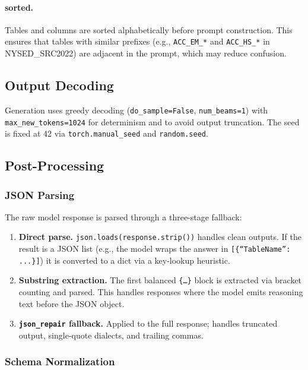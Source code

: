 \documentclass[11pt,letterpaper]{article}
\begin{document}
\paragraph{sorted.}
Tables and columns are sorted alphabetically before prompt construction.
This ensures that tables with similar prefixes (e.g.,
\texttt{ACC\_EM\_*} and \texttt{ACC\_HS\_*} in NYSED\_SRC2022) are adjacent
in the prompt, which may reduce confusion.

\subsection{Output Decoding}

Generation uses greedy decoding (\texttt{do\_sample=False},
\texttt{num\_beams=1}) with \texttt{max\_new\_tokens=1024} for
determinism and to avoid output truncation.
The seed is fixed at 42 via \texttt{torch.manual\_seed} and
\texttt{random.seed}.

\subsection{Post-Processing}

\subsubsection{JSON Parsing}

The raw model response is parsed through a three-stage fallback:

\begin{enumerate}[leftmargin=*,noitemsep]
  \item \textbf{Direct parse.}
        \texttt{json.loads(response.strip())} handles clean outputs.
        If the result is a JSON list (e.g., the model wraps the answer in
        \texttt{[\{``TableName'': ...\}]}) it is converted to a dict via a
        key-lookup heuristic.
  \item \textbf{Substring extraction.}
        The first balanced \texttt{\{\ldots\}} block is extracted via bracket
        counting and parsed.
        This handles responses where the model emits reasoning text before
        the JSON object.
  \item \textbf{\texttt{json\_repair} fallback.}
        Applied to the full response; handles truncated output, single-quote
        dialects, and trailing commas.
\end{enumerate}

\subsubsection{Schema Normalization}
\end{document}
